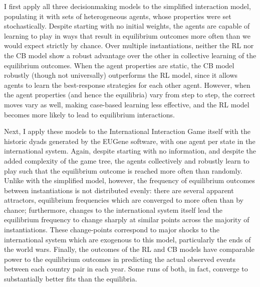 I first apply all three decisionmaking models to the simplified interaction model, populating it with sets of heterogeneous agents, whose properties were set stochastically. Despite starting with no initial weights, the agents are capable of learning to play in ways that result in equilibrium outcomes more often than we would expect strictly by chance. Over multiple instantiations, neither the RL nor the CB model show a robust advantage over the other in collective learning of the equilibrium outcomes. When the agent properties are static, the CB model robustly (though not universally) outperforms the RL model, since it allows agents to learn the best-response strategies for each other agent. However, when the agent properties (and hence the equilibria) vary from step to step, the correct moves vary as well, making case-based learning less effective, and the RL model becomes more likely to lead to equilibrium interactions.

Next, I apply these models to the International Interaction Game itself with the historic dyads generated by the EUGene software, with one agent per state in the international system. Again, despite starting with no information, and despite the added complexity of the game tree, the agents collectively and robustly learn to play such that the equilibrium outcome is reached more often than randomly. Unlike with the simplified model, however, the frequency of equilibrium outcomes between instantiations is not distributed evenly: there are several apparent attractors, equilibrium frequencies which are converged to more often than by chance; furthermore, changes to the international system itself lead the equilibrium frequency to change sharply at similar points across the majority of instantiations. These change-points correspond to major shocks to the international system which are exogenous to this model, particularly the ends of the world wars. Finally, the outcomes of the RL and CB models have comparable power to the equilibrium outcomes in predicting the actual observed events between each country pair in each year. Some runs of both, in fact, converge to substantially better fits than the equilibria. 

